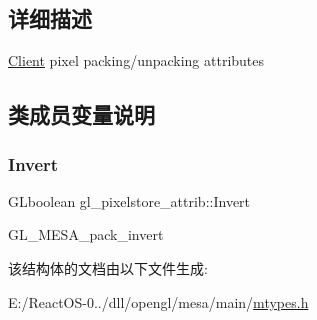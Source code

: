 \subsection{详细描述}
\hyperlink{struct_client}{Client} pixel packing/unpacking attributes 

\subsection{类成员变量说明}
\mbox{\label{structgl__pixelstore__attrib_a6cc73c3174e226d479aaa02c362686fa}} 
\subsubsection{\texorpdfstring{Invert}{Invert}}
{\footnotesize\ttfamily G\+Lboolean gl\+\_\+pixelstore\+\_\+attrib\+::\+Invert}

G\+L\+\_\+\+M\+E\+S\+A\+\_\+pack\+\_\+invert 

该结构体的文档由以下文件生成\+:\begin{DoxyCompactItemize}
\item 
E\+:/\+React\+O\+S-\/0../dll/opengl/mesa/main/\hyperlink{mtypes_8h}{mtypes.\+h}\end{DoxyCompactItemize}
